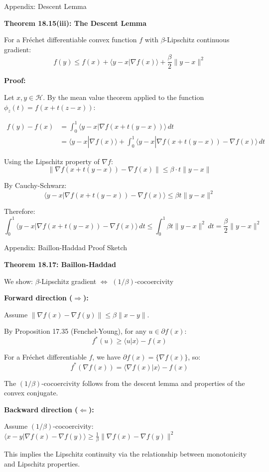 \documentclass[aspectratio=169,10pt]{beamer}
\theoremstyle{definition}
\begin{document}
\begin{frame}[allowframebreaks]{Appendix: Descent Lemma}

\textbf{Theorem 18.15(iii): The Descent Lemma}

For a Fréchet differentiable convex function $f$ with $\beta$-Lipschitz continuous
gradient:
$$f(y) \leq f(x) + \langle y - x | \nabla f(x) \rangle + \frac{\beta}{2}\|y - x\|^2$$

\vspace{0.3cm}

\textbf{Proof:}

Let $x, y \in \mathcal{H}$. By the mean value theorem applied to the function
$\phi_z(t) = f(x + t(z - x))$:

\begin{align}
f(y) - f(x) &= \int_0^1 \langle y - x | \nabla f(x + t(y - x)) \rangle \, dt \\
&= \langle y - x | \nabla f(x) \rangle + \int_0^1 \langle y - x | \nabla f(x + t(y - x)) - \nabla f(x) \rangle \, dt
\end{align}

Using the Lipschitz property of $\nabla f$:
$$\|\nabla f(x + t(y - x)) - \nabla f(x)\| \leq \beta \cdot t\|y - x\|$$

By Cauchy-Schwarz:
$$\langle y - x | \nabla f(x + t(y - x)) - \nabla f(x) \rangle \leq \beta t \|y - x\|^2$$

Therefore:
$$\int_0^1 \langle y - x | \nabla f(x + t(y - x)) - \nabla f(x) \rangle \, dt \leq \int_0^1 \beta t \|y - x\|^2 \, dt = \frac{\beta}{2}\|y - x\|^2$$

\end{frame}

\begin{frame}{Appendix: Baillon-Haddad Proof Sketch}

\textbf{Theorem 18.17: Baillon-Haddad}

We show: $\beta$-Lipschitz gradient $\Leftrightarrow$ $(1/\beta)$-cocoercivity

\vspace{0.3cm}

\textbf{Forward direction ($\Rightarrow$):}

Assume $\|\nabla f(x) - \nabla f(y)\| \leq \beta \|x - y\|$.

By Proposition 17.35 (Fenchel-Young), for any $u \in \partial f(x)$:
$$f^*(u) \geq \langle u | x \rangle - f(x)$$

For a Fréchet differentiable $f$, we have $\partial f(x) = \{\nabla f(x)\}$, so:
$$f^*(\nabla f(x)) = \langle \nabla f(x) | x \rangle - f(x)$$

The $(1/\beta)$-cocoercivity follows from the descent lemma and properties of
the convex conjugate.

\vspace{0.3cm}

\textbf{Backward direction ($\Leftarrow$):}

Assume $(1/\beta)$-cocoercivity: $\langle x - y | \nabla f(x) - \nabla f(y) \rangle \geq \frac{1}{\beta}\|\nabla f(x) - \nabla f(y)\|^2$

This implies the Lipschitz continuity via the relationship between monotonicity
and Lipschitz properties.

\end{frame}
\end{document}
